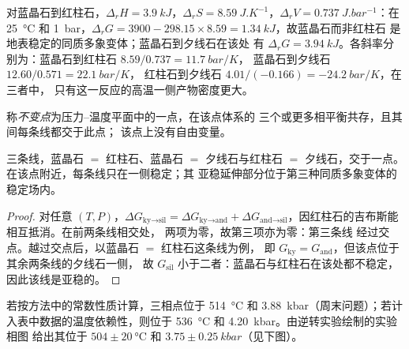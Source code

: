 对蓝晶石到红柱石，$\Delta_r H = \qty{3.9}{kJ}$，$\Delta_r S =
\qty{8.59}{J.K^{-1}}$，$\Delta_r V = \qty{0.737}{J.bar^{-1}}$：在 \qty{25}{\celsius}
和 \qty{1}{bar}，$\Delta_r G = 3900 - 298.15\times8.59 = \qty{+1.34}{kJ}$，故蓝晶石而非红柱石
是地表稳定的同质多象变体；蓝晶石到夕线石在该处
有 $\Delta_r G = \qty{+3.94}{kJ}$。各斜率分别为：蓝晶石到红柱石 $8.59/0.737 = \qty{11.7}{bar/K}$，
蓝晶石到夕线石 $12.60/0.571 = \qty{22.1}{bar/K}$，
红柱石到夕线石 $4.01/(-0.166) = \qty{-24.2}{bar/K}$，在三者中，
只有这一反应的高温一侧产物密度更大。

\begin{definition}[不变点]\label{def:b2:metamorphic-facies:invariant}
称\emph{不变点}为压力–温度平面中的一点，在该点体系的
三个或更多相平衡共存，且其间每条线都交于此点；
该点上没有自由变量。
\end{definition}

\begin{proposition}[三相点]\label{prop:b2:metamorphic-facies:triple}
三条线，蓝晶石 $=$ 红柱石、蓝晶石 $=$ 夕线石与红柱石 $=$
夕线石，交于一点。在该点附近，每条线只在一侧稳定；其
亚稳延伸部分位于第三种同质多象变体的稳定场内。
\end{proposition}

\begin{proof}
对任意 $(T, P)$，$\Delta G_{\text{ky}\to\text{sil}} = \Delta G_{\text{ky}\to\text{and}} +
\Delta G_{\text{and}\to\text{sil}}$，因红柱石的吉布斯能相互抵消。在前两条线相交处，
两项为零，故第三项亦为零：第三条线
经过交点。越过交点后，以蓝晶石 $=$ 红柱石这条线为例，
即 $G_{\text{ky}} = G_{\text{and}}$，但该点位于其余两条线的夕线石一侧，
故 $G_{\text{sil}}$ 小于二者：蓝晶石与红柱石在该处都不稳定，
因此该线是亚稳的。
\end{proof}

若按方法中的常数性质计算，三相点位于
\qty{514}{\celsius} 和 \qty{3.88}{kbar}（周末问题）；若计入表中数据的温度依赖性，则位于
\qty{536}{\celsius} 和 \qty{4.20}{kbar}。由逆转实验绘制的实验相图
给出其位于 $504 \pm \qty{20}{\celsius}$ 和
$3.75 \pm \qty{0.25}{kbar}$（见下图）。

